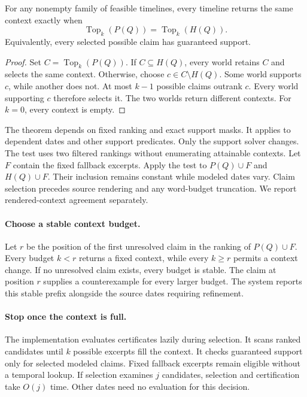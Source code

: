 \begin{theorem}
\label{thm:context-stability}
For any nonempty family of feasible timelines, every timeline returns the same context exactly when
\begin{equation}
 \operatorname{Top}_k(P(Q))=\operatorname{Top}_k(H(Q)).
\label{eq:context-stability}
\end{equation}
Equivalently, every selected possible claim has guaranteed support.
\end{theorem}
\begin{proof}
Set $C=\operatorname{Top}_k(P(Q))$.
If $C\subseteq H(Q)$, every world retains $C$ and selects the same context.
Otherwise, choose $c\in C\setminus H(Q)$.
Some world supports $c$, while another does not.
At most $k-1$ possible claims outrank $c$.
Every world supporting $c$ therefore selects it.
The two worlds return different contexts.
For $k=0$, every context is empty.
\end{proof}

The theorem depends on fixed ranking and exact support masks.
It applies to dependent dates and other support predicates.
Only the support solver changes.
The test uses two filtered rankings without enumerating attainable contexts.
Let $F$ contain the fixed fallback excerpts.
Apply the test to $P(Q)\cup F$ and $H(Q)\cup F$.
Their inclusion remains constant while modeled dates vary.
Claim selection precedes source rendering and any word-budget truncation.
We report rendered-context agreement separately.

\paragraph{Choose a stable context budget.}
Let $r$ be the position of the first unresolved claim in the ranking of $P(Q)\cup F$.
Every budget $k<r$ returns a fixed context, while every $k\ge r$ permits a context change.
If no unresolved claim exists, every budget is stable.
The claim at position $r$ supplies a counterexample for every larger budget.
The system reports this stable prefix alongside the source dates requiring refinement.

\paragraph{Stop once the context is full.}
The implementation evaluates certificates lazily during selection.
It scans ranked candidates until $k$ possible excerpts fill the context.
It checks guaranteed support only for selected modeled claims.
Fixed fallback excerpts remain eligible without a temporal lookup.
If selection examines $j$ candidates, selection and certification take $O(j)$ time.
Other dates need no evaluation for this decision.




